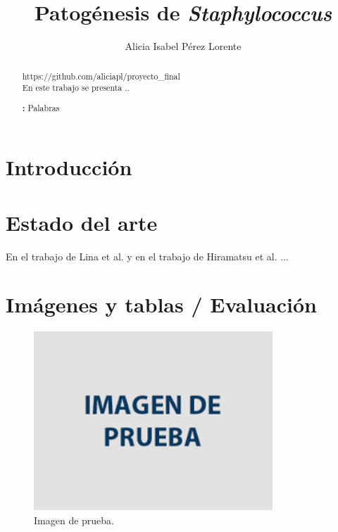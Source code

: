 \documentclass[]{article}
\newenvironment{keywords}
{\par\noindent\small\textbf{\keywordsname:}}
{\par}
\begin{document}

\title{Patogénesis de \textit{Staphylococcus}}

\author{Alicia Isabel Pérez Lorente}



\maketitle              


\begin{abstract} https://github.com/aliciapl/proyecto\_final \\
	En este trabajo se presenta ..

\begin{keywords}
	Palabras
\end{keywords}


\end{abstract}


\section{Introducción}

\section{Estado del arte}
En el trabajo de Lina et al. \cite{Lina1999} y en el trabajo de Hiramatsu et al. \cite{Hiramatsu1997}...
\section{Imágenes y tablas / Evaluación}


\begin{figure}[!h]
	\centering
	\includegraphics[width=0.8\textwidth]{images/prueba.png}
	\caption{ Imagen de prueba. } \label{fig1}
\end{figure}
\end{document}
